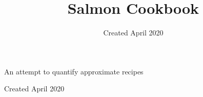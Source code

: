 \documentclass[12pt, oneside]{article}
\title{Salmon Cookbook}
\date{Created April 2020}
\begin{document}

\begin{titlepage}
    \begin{center}
        \vspace*{4cm}
            
        \Huge
        
        \vspace{1cm}
        \Large
        An attempt to quantify approximate recipes
            
        \vfill
        \Large
        Created April 2020
            
    \end{center}
\end{titlepage}


\tableofcontents
\thispagestyle{empty}
\newpage
\setcounter{page}{1}
\rhead{\thepage}








\end{document}
